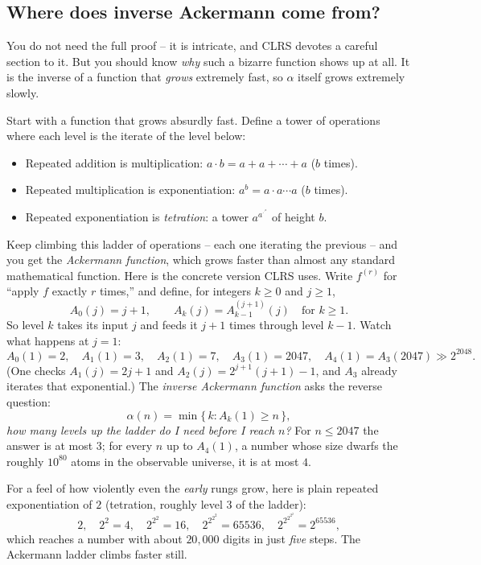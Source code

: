 \subsection{Where does inverse Ackermann come from?}
\label{ch19:ackermann}

You do not need the full proof -- it is intricate, and CLRS devotes a careful
section to it. But you should know \emph{why} such a bizarre function shows up at
all. It is the inverse of a function that \emph{grows} extremely fast, so
$\alpha$ itself grows extremely slowly.

Start with a function that grows absurdly fast. Define a tower of operations
where each level is the iterate of the level below:

\begin{itemize}
  \item Repeated addition is multiplication: $a \cdot b = a + a + \cdots + a$
        ($b$ times).
  \item Repeated multiplication is exponentiation: $a^b = a \cdot a \cdots a$
        ($b$ times).
  \item Repeated exponentiation is \emph{tetration}: a tower
        $a^{a^{\cdot^{\cdot^{a}}}}$ of height $b$.
\end{itemize}

Keep climbing this ladder of operations -- each one iterating the previous --
and you get the \emph{Ackermann function}, which grows faster than almost any standard mathematical function. Here is the concrete version CLRS uses. Write
$f^{(r)}$ for ``apply $f$ exactly $r$ times,'' and define, for integers
$k \ge 0$ and $j \ge 1$,
\[
  A_0(j) = j + 1,
  \qquad
  A_k(j) = A_{k-1}^{(j+1)}(j) \quad \text{for } k \ge 1.
\]
So level $k$ takes its input $j$ and feeds it $j+1$ times through level $k-1$.
Watch what happens at $j = 1$:
\[
  A_0(1) = 2,\quad A_1(1) = 3,\quad A_2(1) = 7,\quad A_3(1) = 2047,\quad
  A_4(1) = A_3(2047) \gg 2^{2048}.
\]
(One checks $A_1(j) = 2j+1$ and $A_2(j) = 2^{j+1}(j+1) - 1$, and $A_3$ already
iterates that exponential.) The \emph{inverse Ackermann function} asks the
reverse question:
\[
  \alpha(n) = \min\{\, k : A_k(1) \ge n \,\},
\]
\emph{how many levels up the ladder do I need before I reach $n$?} For
$n \le 2047$ the answer is at most $3$; for every $n$ up to $A_4(1)$, a number
whose size dwarfs the roughly $10^{80}$ atoms in the observable universe, it is
at most $4$.

For a feel of how violently even the \emph{early} rungs grow, here is plain
repeated exponentiation of $2$ (tetration, roughly level $3$ of the ladder):
\[
2,\quad 2^2 = 4,\quad 2^{2^2} = 16,\quad 2^{2^{2^2}} = 65536,\quad
2^{2^{2^{2^2}}} = 2^{65536},
\]
which reaches a number with about $20{,}000$ digits in just \emph{five} steps.
The Ackermann ladder climbs faster still.

